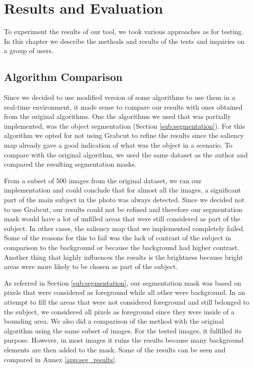 \chapter{Results and Evaluation}
\label{cha:results}

To experiment the results of our tool, we took various approaches as for testing. In this chapter we describe the methods and results of the tests and inquiries on a group of users.

\section{Algorithm Comparison}

Since we decided to use modified version of some algorithms to use them in a real-time environment, it made sense to compare our results with ones obtained from the original algorithms. 
One the algorithms we used that was partially implemented, was the object segmentation (Section \ref{sub:segmentation}). For this algorithm we opted for not using Grabcut \cite{rother2004grabcut} to refine the results since the saliency map already gave a good indication of what was the object in a scenario.  To compare with the original algorithm, we used the same dataset as the author and compared the resulting segmentation masks.

From a subset of 500 images from the original dataset, we ran our implementation and could conclude that for almost all the images, a significant part of the main subject in the photo was always detected. Since we decided not to use Grabcut, our results could not be refined and therefore our segmentation mask would have a lot of unfilled areas that were still considered as part of the subject. In other cases, the saliency map that we implemented completely failed. Some of the reasons for this to fail was the lack of contrast of the subject in comparison to the background or because the background had higher contrast. Another thing that highly influences the results is the brightness because bright areas were more likely to be chosen as part of the subject.

As referred in Section \ref{sub:segmentation}, our segmentation mask was based on pixels that were considered as foreground while all other were background. In an attempt to fill the areas that were not considered foreground and still belonged to the subject, we considered all pixels as foreground since they were inside of a bounding area. We also did a comparison of the method with the original algorithm using the same subset of images. 
For the tested images, it fulfilled its purpose. However, in most images it ruins the results because many background elements are then added to the mask. Some of the results can be seen and compared in Annex \ref{app:seg_results}.


